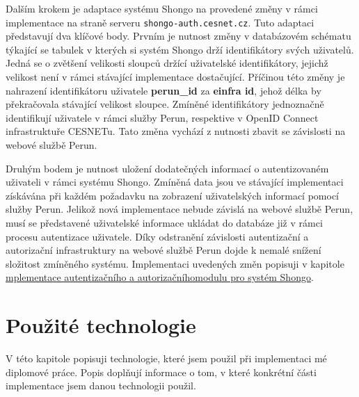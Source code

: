 \documentclass[
  printed, %
  twoside, %
  table,   %
  nolof,     %
  nolot,     %
]{fithesis3}
\begin{document}
Dalším krokem je adaptace systému Shongo na provedené změny v rámci implementace na straně serveru \texttt{shongo-auth.cesnet.cz}. Tuto adaptaci představují dva klíčové body. Prvním je nutnost změny v databázovém schématu týkající se tabulek v kterých si systém Shongo drží identifikátory svých uživatelů. Jedná se o zvětšení velikosti sloupců držící uživatelské identifikátory, jejichž velikost není v rámci stávající implementace dostačující. Příčinou této změny je nahrazení identifikátoru uživatele \textbf{perun\_id} za \textbf{einfra id}, jehož délka by překračovala stávající velikost sloupce. Zmíněné identifikátory jednoznačně identifikují uživatele v rámci služby Perun, respektive v OpenID Connect infrastruktuře CESNETu. Tato změna vychází z nutnosti zbavit se závislosti na webové službě Perun. \par

Druhým bodem je nutnost uložení dodatečných informací o autentizovaném uživateli v rámci systému Shongo. Zmíněná data jsou ve stávající implementaci získávána při každém požadavku na zobrazení uživatelských informací pomocí služby Perun. Jelikož nová implementace nebude závislá na webové službě Perun, musí se představené uživatelské informace ukládat do databáze již v rámci procesu autentizace uživatele. Díky odstranění závislosti autentizační a autorizační infrastruktury na webové službě Perun dojde k nemalé snížení složitost zmíněného systému. Implementaci uvedených změn popisuji v kapitole \hyperref[ShongoImpl]{mplementace autentizačního a autorizačníhomodulu pro systém Shongo}.

\chapter{Použité technologie}
V této kapitole popisuji technologie, které jsem použil při implementaci mé diplomové práce. Popis doplňují informace o tom, v které konkrétní části implementace jsem danou technologii použil.
\end{document}
